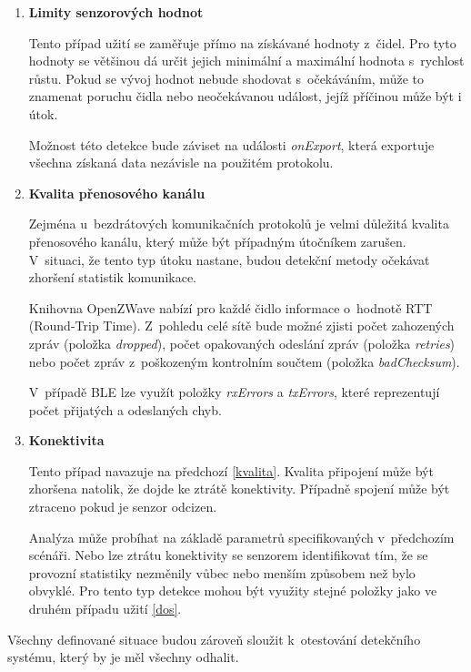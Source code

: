 \begin{enumerate}
    \item \textbf{Limity senzorových hodnot}
    
    Tento případ užití se zaměřuje přímo na získávané hodnoty z~čidel. Pro tyto hodnoty se většinou
    dá určit jejich minimální a maximální hodnota s~rychlost růstu. Pokud se vývoj hodnot nebude 
    shodovat s~očekáváním, může to znamenat poruchu čidla nebo neočekávanou událost, jejíž příčinou 
    může být i útok.
    
    Možnost této detekce bude záviset na události \textit{onExport}, která exportuje všechna
    získaná data nezávisle na použitém protokolu.
    
    \item \textbf{Kvalita přenosového kanálu} \label{kvalita}
    
    Zejména u~bezdrátových komunikačních protokolů je velmi důležitá kvalita přenosového kanálu,
    který může být případným útočníkem zarušen. V~situaci, že tento typ útoku nastane, budou 
    detekční metody očekávat zhoršení statistik komunikace. 
    
    Knihovna OpenZWave nabízí pro každé čidlo informace o~hodnotě RTT (Round-Trip Time). Z~pohledu 
    celé sítě bude možné zjisti počet zahozených zpráv (položka \textit{dropped}), počet
    opakovaných odeslání zpráv (položka \textit{retries}) nebo počet zpráv z~poškozeným kontrolním
    součtem (položka \textit{badChecksum}).
    
    V~případě BLE lze využít položky \textit{rxErrors} a \textit{txErrors}, které reprezentují
    počet přijatých a odeslaných chyb.
    
    \item \textbf{Konektivita}
    
    Tento případ navazuje na předchozí \ref{kvalita}. Kvalita připojení může být zhoršena natolik, že dojde 
    ke ztrátě konektivity. Případně spojení může být ztraceno pokud je senzor odcizen. 
    
    Analýza může probíhat na základě parametrů specifikovaných v~předchozím scénáři. Nebo lze 
    ztrátu konektivity se senzorem identifikovat tím, že se provozní statistiky nezměnily vůbec nebo
    menším způsobem než bylo obvyklé. Pro tento typ detekce mohou být využity stejné položky
    jako ve druhém případu užití \ref{dos}.
    
   \end{enumerate}

  Všechny definované situace budou zároveň sloužit k~otestování detekčního systému, který by je
  měl všechny odhalit.